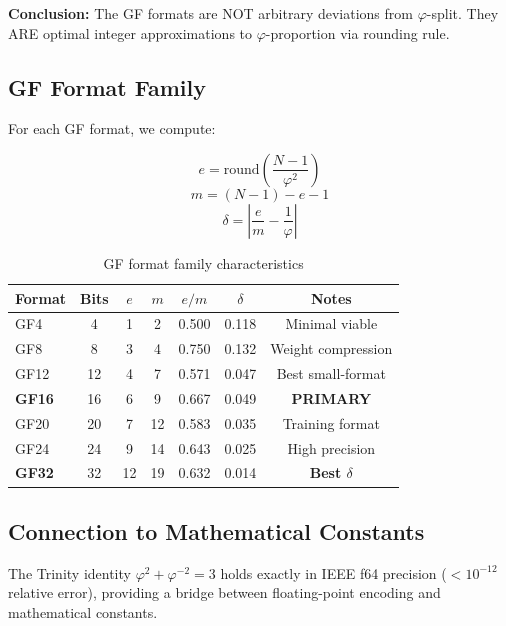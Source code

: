 \documentclass{article}
\begin{document}
\textbf{Conclusion:} The GF formats are NOT arbitrary deviations from $\varphi$-split. They ARE optimal integer approximations to $\varphi$-proportion via rounding rule.

\subsection{GF Format Family}

For each GF format, we compute:

$$e = \text{round}\left(\frac{N-1}{\varphi^2}\right)$$
$$m = (N-1) - e - 1$$
$$\delta = \left|\frac{e}{m} - \frac{1}{\varphi}\right|$$

\begin{table}[h]
\centering
\begin{tabular}{lcccccc}
\toprule
Format & Bits & $e$ & $m$ & $e/m$ & $\delta$ & Notes \\
\midrule
GF4    & 4     & 1   & 2    & 0.500 & 0.118 & Minimal viable \\
GF8    & 8     & 3   & 4    & 0.750 & 0.132 & Weight compression \\
GF12   & 12    & 4   & 7    & 0.571 & 0.047 & Best small-format \\
\textbf{GF16} & 16  & 6   & 9    & 0.667 & 0.049 & \textbf{PRIMARY} \\
GF20   & 20    & 7   & 12   & 0.583 & 0.035 & Training format \\
GF24   & 24    & 9   & 14   & 0.643 & 0.025 & High precision \\
\textbf{GF32} & 32    & 12  & 19   & 0.632 & 0.014 & \textbf{Best $\delta$} \\
\bottomrule
\end{tabular}
\caption{GF format family characteristics}
\end{table}

\subsection{Connection to Mathematical Constants}

The Trinity identity $\varphi^2 + \varphi^{-2} = 3$ holds exactly in IEEE f64 precision ($< 10^{-12}$ relative error), providing a bridge between floating-point encoding and mathematical constants.

\end{document}
